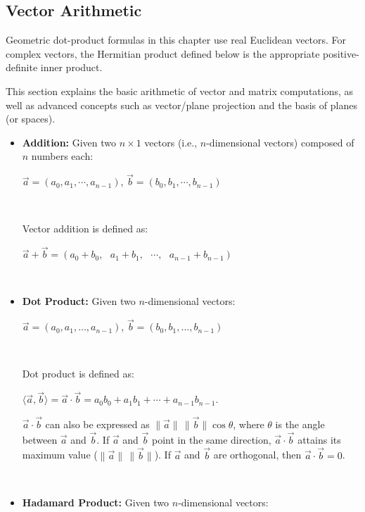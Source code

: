 

\subsection{Vector Arithmetic}
\label{subsec:vector-arithmetic}

Geometric dot-product formulas in this chapter use real Euclidean vectors. For complex vectors, the Hermitian product defined below is the appropriate positive-definite inner product.

This section explains the basic arithmetic of vector and matrix computations, as well as advanced concepts such as vector/plane projection and the basis of planes (or spaces). 


\begin{tcolorbox}[title={\textbf{\tboxdef{\ref*{subsec:vector-arithmetic}} Vector Arithmetic}}]

\begin{itemize}
\item \textbf{Addition:} Given two $n \times 1$ vectors (i.e., $n$-dimensional vectors) composed of $n$ numbers each:

$\vec{a} = (a_0, a_1,\cdots, a_{n-1})$, $\vec{b} = (b_0, b_1,\cdots, b_{n-1})$

$ $

Vector addition is defined as: 

$ \vec{a} + \vec{b} = (a_0 + b_0, \text{ } a_1  +  b_1, \text{ }\cdots, \text{ } a_{n-1}  +  b_{n-1})$

$ $

\item \textbf{Dot Product:} Given two $n$-dimensional vectors:

$\vec{a} = (a_0, a_1,\ldots, a_{n-1})$, $\vec{b} = (b_0, b_1,\ldots, b_{n-1})$

$ $

Dot product is defined as: 

$\langle \vec{a}, \vec{b} \rangle =  \vec{a} \cdot \vec{b} = a_0 b_0 + a_1 b_1 +\cdots + a_{n-1} b_{n-1}$.

$\vec{a} \cdot \vec{b}$ can also be expressed as $\|\vec{a}\|\,\|\vec{b}\|\cos\theta$, where $\theta$ is the angle between $\vec{a}$ and $\vec{b}$. If $\vec{a}$ and $\vec{b}$ point in the same direction, $\vec{a}\cdot\vec{b}$ attains its maximum value ($\|\vec{a}\|\,\|\vec{b}\|$). If $\vec{a}$ and $\vec{b}$ are orthogonal, then $\vec{a}\cdot\vec{b} = 0$.

$ $


\item \textbf{Hadamard Product:} Given two $n$-dimensional vectors:


\end{itemize}
\end{tcolorbox}
